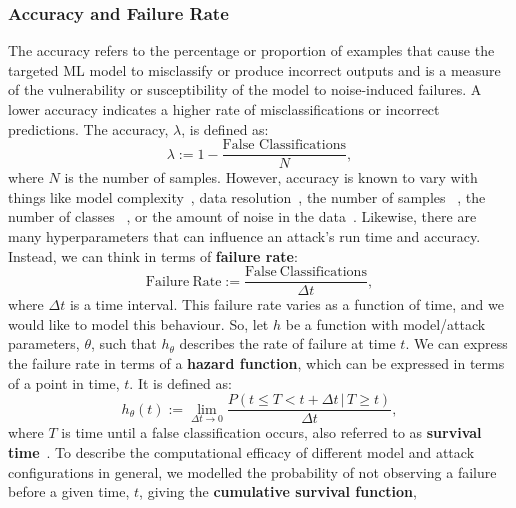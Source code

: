 \subsubsection{Accuracy and Failure Rate}
The accuracy refers to the percentage or proportion of examples that cause the targeted ML model to misclassify or produce incorrect outputs and is a measure of the vulnerability or susceptibility of the model to noise-induced failures. A lower accuracy indicates a higher rate of misclassifications or incorrect predictions. The accuracy, $\lambda$, is defined as:
\begin{equation}
    \lambda := 1 -  \frac{\textrm{False~Classifications}}{N},
    \label{eq:acc}
\end{equation}
where $N$ is the number of samples.
However, accuracy is known to vary with things like model complexity~\cite{vgg,resnet}, data resolution~\cite{feature_squeezing}, the number of samples~\cite{vapnik1994measuring} , the number of classes ~\cite{dohmatob_generalized_2019}, or the amount of noise in the data~\cite{gauss_aug,gauss_out,dohmatob_generalized_2019}. Likewise, there are many hyperparameters that can influence an attack's run time and accuracy. Instead, we can think in terms of \textbf{failure rate}:
\begin{equation}
    \mathrm{Failure~Rate} := \frac{\mathrm{False~Classifications}}{\Delta t},
    \label{eq:failure_rate}
\end{equation}
where $\Delta t$ is a time interval. This failure rate varies as a function of time, and we would like to model this behaviour. 
So, let $h$ be a function with model/attack parameters, $\theta$, such that $h_{\theta}$ describes the rate of failure at time $t$.
We can express the failure rate in terms of a \textbf{hazard function}, which can be expressed in terms of a point in time, $t$. It is defined as:
\begin{equation}
    h_{\theta}(t) := \lim_{ \Delta t \rightarrow 0} \frac{P(t \leq T < t + \Delta t \,|\, T \geq t)}{\Delta t},
    \label{eq:failure_rate_h}
\end{equation}
where $T$ is time until a false classification occurs, also referred to as \textbf{survival time}~\cite{kleinbaum1996survival}. To describe the computational efficacy of different model and attack configurations in general, we modelled the
probability of not observing a failure before a given time, $t$, giving the \textbf{cumulative survival function},
